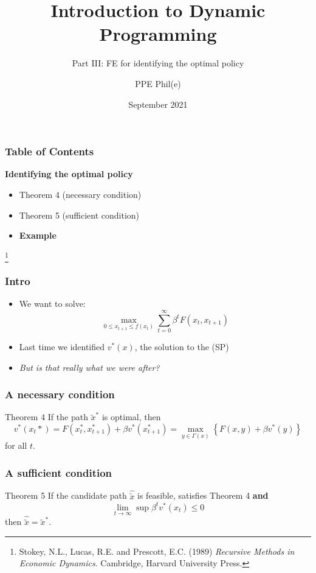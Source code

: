 \documentclass[aspectratio=169]{beamer}
\title[Dynamic Programming Part III] %
{Introduction to Dynamic Programming}
\subtitle{Part III: FE for identifying the optimal policy}
\author[PPE Phil(e)]
{PPE Phil(e)\inst{1}}
\institute[] %
{
  \inst{1}%
  material @ https://github.com/PPEphile
}
\date[2021] %
{September 2021}
\newcommand\blfootnote[1]{%
\begingroup
\renewcommand\thefootnote{}\footnote{#1}%
\addtocounter{footnote}{-1}%
\endgroup
}
\begin{document}
\frame{\titlepage}

\begin{frame}
\frametitle{Table of Contents}
\textbf{Identifying the \color{teal} optimal policy} \color{black} 
\begin{itemize}
\item Theorem 4 (necessary condition)
\item Theorem 5 (sufficient condition)
\item \textbf{Example}
\end{itemize}

\blfootnote{Stokey, N.L., Lucas, R.E. and Prescott, E.C. (1989) \textit{Recursive Methods in Economic Dynamics}. Cambridge, Harvard University Press.}

\end{frame}
%
\begin{frame}
\frametitle{Intro}
\begin{itemize}
\item We want to solve: 
\begin{equation}
\max_{0 \leq x_{t+1} \leq f(x_t)} \sum^{\infty}_{t=0} \beta^t F(x_t, x_{t+1}) \tag{SP}
\end{equation}
\item Last time we identified $v^*(x)$, the solution to the (SP)
\item \color{red}\textit{ But is that really what we were after?} \color{black}
\end{itemize}
\end{frame}



\begin{frame}
\frametitle{A necessary condition}
\begin{block}{Theorem 4}
If the path $\utilde{x}^{*}$ is optimal, then
\begin{equation*}
v^{*}(x_{t}{*}) = F(x_{t}^{*}, x_{t+1}^{*}) + \beta v^{*}(x_{t+1}^{*}) = \max_{y \in \Gamma(x)} \left\lbrace F(x, y) + \beta v^{*}(y) \right\rbrace
\end{equation*}
for all $t$.
\end{block}
\end{frame}

\begin{frame}
\frametitle{A sufficient condition}
\begin{block}{Theorem 5}
If the candidate path $\hat{\utilde{x}}$ is feasible, satisfies Theorem 4 \textbf{and}
\begin{equation*}
\lim_{t \to \infty} \sup \beta^{t}v^{*}(\hat{x}_{t}) \leq 0 
\end{equation*}
then $\hat{\utilde{x}} = \utilde{x}^{*}$.
\end{block}
\end{frame}
\end{document}
